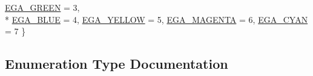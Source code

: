 \begin{DoxyCompactItemize}
\hyperlink{namespace_excel_format_a364083dd3e8458922432cda973661a6ea03d672ad86f219a1aa21af624c0b27d0}{E\+G\+A\+\_\+\+G\+R\+E\+E\+N} = 3, 
\\*
\hyperlink{namespace_excel_format_a364083dd3e8458922432cda973661a6eac9bb917282d36a37e100f193d09f8326}{E\+G\+A\+\_\+\+B\+L\+U\+E} = 4, 
\hyperlink{namespace_excel_format_a364083dd3e8458922432cda973661a6eaedfeba916bbb82feb23996392e28ed8c}{E\+G\+A\+\_\+\+Y\+E\+L\+L\+O\+W} = 5, 
\hyperlink{namespace_excel_format_a364083dd3e8458922432cda973661a6ea6e97ab49306222e6f4bc7350620923fe}{E\+G\+A\+\_\+\+M\+A\+G\+E\+N\+T\+A} = 6, 
\hyperlink{namespace_excel_format_a364083dd3e8458922432cda973661a6eac2e0b20dd2889319ca79d193834c25f8}{E\+G\+A\+\_\+\+C\+Y\+A\+N} = 7
 \}
\end{DoxyCompactItemize}


\subsection{Enumeration Type Documentation}
\hypertarget{namespace_excel_format_addb246db2721d76cfc19bec63b35636d}{}
